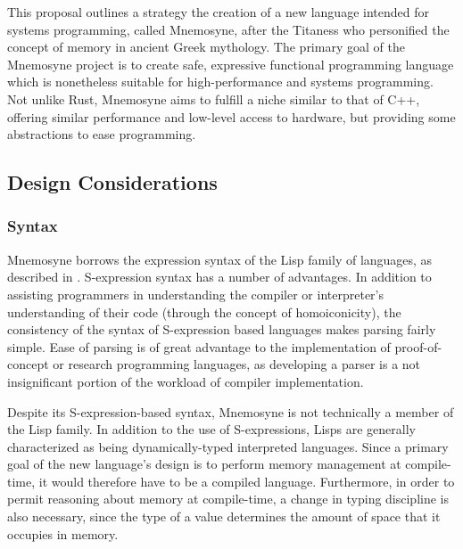 \documentclass[11pt,draft]{article}
\theoremstyle{break}
\begin{document}
This proposal outlines a strategy the creation of a new language intended for systems programming, called Mnemosyne, after the Titaness who personified the concept of memory in ancient Greek mythology. The primary goal of the Mnemosyne project is to create safe, expressive functional programming language which is nonetheless suitable for high-performance and systems programming. Not unlike Rust, Mnemosyne aims to fulfill a niche similar to that of C++, offering similar performance and low-level access to hardware, but providing some abstractions to ease programming.

\subsection{Design Considerations}

\subsubsection{Syntax}

Mnemosyne borrows the expression syntax of the Lisp family of languages, as described in . S-expression syntax has a number of advantages. In addition to assisting programmers in understanding the compiler or interpreter's understanding of their code (through the concept of homoiconicity), the consistency of the syntax of S-expression based languages makes parsing fairly simple. Ease of parsing is of great advantage to the implementation of proof-of-concept or research programming languages, as developing a parser is a not insignificant portion of the workload of compiler implementation.

Despite its S-expression-based syntax, Mnemosyne is not technically a member of the Lisp family. In addition to the use of S-expressions, Lisps are generally characterized as being dynamically-typed interpreted languages. Since a primary goal of the new language's design is to perform memory management at compile-time, it would therefore have to be a compiled language. Furthermore, in order to permit reasoning about memory at compile-time, a change in typing discipline is also necessary, since the type of a value determines the amount of space that it occupies in memory.
\end{document}
